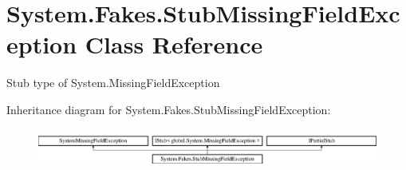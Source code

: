 \hypertarget{class_system_1_1_fakes_1_1_stub_missing_field_exception}{\section{System.\-Fakes.\-Stub\-Missing\-Field\-Exception Class Reference}
\label{class_system_1_1_fakes_1_1_stub_missing_field_exception}
}


Stub type of System.\-Missing\-Field\-Exception 


Inheritance diagram for System.\-Fakes.\-Stub\-Missing\-Field\-Exception\-:\begin{figure}[H]
\begin{center}
\leavevmode
\includegraphics[height=1.333333cm]{class_system_1_1_fakes_1_1_stub_missing_field_exception}
\end{center}
\end{figure}
